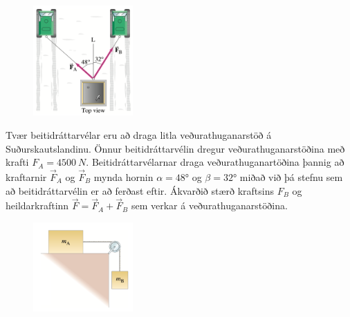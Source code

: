 \ifdefined \wholebook \else\documentclass[oneside]{book}\usepackage{EdlBook}\graphicspath{{figures/}}
\begin{document}
\begin{enumerate}[label = \textbf{Dæmi \thechapter.\arabic*.}]
\begin{minipage}{\linewidth}
\end{minipage}

\vspace{0.4cm}

\begin{minipage}{\linewidth}
\begin{figure}
\vspace{-0.5cm}
\includegraphics[width=1.5in]{images/snowcat.png}
\end{figure}

\item Tvær beitidráttarvélar eru að draga litla veðurathuganarstöð á Suðurskautslandinu. Önnur beitidráttarvélin dregur veðurathuganarstöðina með krafti $F_A = \SI{4500}{N}$. Beitidráttarvélarnar draga veðurathuganartöðina þannig að kraftarnir $\vec{F}_A$ og $\vec{F}_B$ mynda hornin $\alpha = \ang{48}$ og $\beta = \ang{32}$ miðað við þá stefnu sem að beitidráttarvélin er að ferðast eftir. Ákvarðið stærð kraftsins $F_B$ og heildarkraftinn $\vec{F} = \vec{F}_A + \vec{F}_B$ sem verkar á veðurathuganarstöðina.
\end{minipage}

\vspace{0.5cm}

\begin{minipage}{\linewidth}
\begin{figure}
\vspace{0.5cm}
\includegraphics[width=1.5in]{images/trissbert.png}
\end{figure}


\end{minipage}
\end{enumerate}
\end{document}
